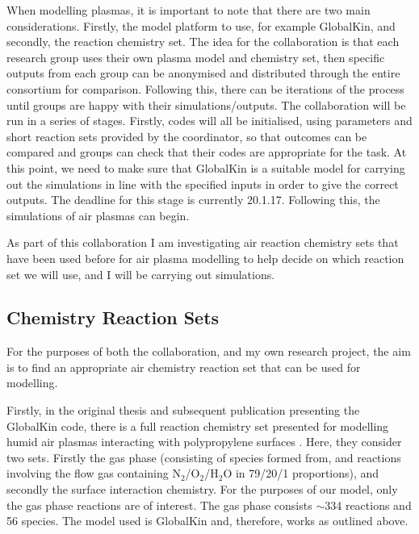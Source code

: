 \documentclass[11pt, oneside]{article}   	%
\begin{document}
When modelling plasmas, it is important to note that there are two main considerations.
Firstly, the model platform to use, for example GlobalKin, and secondly, the reaction chemistry set.
The idea for the collaboration is that each research group uses their own plasma model and chemistry set, then specific outputs from each group can be anonymised and distributed through the entire consortium for comparison.
Following this, there can be iterations of the process until groups are happy with their simulations/outputs.
The collaboration will be run in a series of stages.
Firstly, codes will all be initialised, using parameters and short reaction sets provided by the coordinator, so that outcomes can be compared and groups can check that their codes are appropriate for the task.
At this point, we need to make sure that GlobalKin is a suitable model for carrying out the simulations in line with the specified inputs in order to give the correct outputs.
The deadline for this stage is currently 20.1.17.
Following this, the simulations of air plasmas can begin.

As part of this collaboration I am investigating air reaction chemistry sets that have been used before for air plasma modelling to help decide on which reaction set we will use, and I will be carrying out simulations.


\subsection{Chemistry Reaction Sets}
For the purposes of both the collaboration, and my own research project, the aim is to find an appropriate air chemistry reaction set that can be used for modelling.

Firstly, in the original thesis and subsequent publication presenting the GlobalKin code, there is a full reaction chemistry set presented for modelling humid air plasmas interacting with polypropylene surfaces \cite{Dorai2002modeling, Dorai2003a}.
Here, they consider two sets.
Firstly the gas phase (consisting of species formed from, and reactions involving the flow gas containing N$_2$/O$_2$/H$_2$O in 79/20/1 proportions), and secondly the surface interaction chemistry. 
For the purposes of our model, only the gas phase reactions are of interest.
The gas phase consists $\sim$334 reactions and 56 species. 
The model used is GlobalKin and, therefore, works as outlined above.
\end{document}
